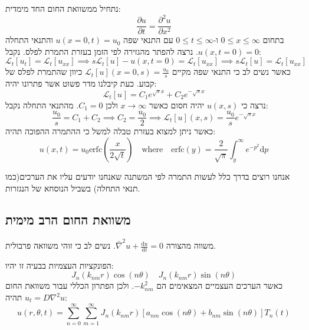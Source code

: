 \documentclass{tstextbook}
\begin{document}
\begin{example}
נתחיל ממשוואת החום החד מימדית:
$$\frac{\partial u}{\partial t} =\frac{\partial^{2}u}{\partial x^{2}} $$
בתחום \(0\leq x \leq \infty\) ו-\(0\leq t\leq \infty\) עם התנאי שפה \(u(x=0,t)=u_{0}\) והתנאי התחלה \(u(x,t=0)=0\). נרצה להפתר מהגזירה לפי הזמן בעזרת התמרת לפלס. נקבל:
$$\mathcal{L}_{t}[u_{t}]=\mathcal{L}_{t}[u_{x x}]\implies s\mathcal{L}_{t}[u]-u(x,t=0)=\mathcal{L}_{t}[u_{x x}]\implies s \mathcal{L}_{t}[u] = \mathcal{L}_{t}[u_{x x}]$$
כאשר נשים לב כי התנאי שפה מקיים \(\mathcal{L}_{t}[u](x=0,s)=\frac{u_{0}}{s}\) כיוון שהתמרת לפלס של קבוע. כעת קיבלנו מדר פשוט אשר פתרונו יהיה:
$$\mathcal{L}_{t}[u_{}]= C_{1}e^{ \sqrt{ s }x }+C_{2}e^{ -\sqrt{ s }x }$$
נרצה כי \(u(x,s)\) יהיה חסום כאשר \(x\to \infty\) ולכן \(C_{1} = 0\). מהתנאי התחלה נקבל:
$$\frac{u_{0}}{s}=C_{1}+C_{2}\implies C_{2}=\frac{u_{0}}{2}\implies \mathcal{L}_{t}[u](x,s)=\frac{u_{0}}{s}e^{ -\sqrt{ s }x }$$
כאשר ניתן למצוא בעזרת טבלה למשל כי ההתמרה ההפוכה תהיה:
$$u(x,t)=u_{0}\mathrm{erfc}\left( \frac{x}{2\sqrt{ t }} \right)\quad \mathrm{where}\quad \mathrm{erfc}(y)=\frac{2}{\sqrt{ \pi }}\int_{y}^{\infty}e^{ -p^{2} }\mathrm{d}p$$

\end{example}
\begin{remark}
אנחנו רוצים בדרך כלל לעשות התמרה לפי המשתנה שאנחנו יודעים עליו את הערכים(כמו תנאי התחלה) בשביל הנוסחא של הנגזרות.

\end{remark}
\subsection{משוואת החום הרב מימית}

\begin{definition}
משווה מהצורה \(\bar{\nabla}^2u+\frac{\mathrm{d} u}{\mathrm{d} t}=0\). נשים לב כי זוהי משוואה פרבולית.

\end{definition}
\begin{proposition}
הפונקציות העצמיות בבעיה זו יהיו:
$$J_{n}\left(k_{nm}r\right)\cos\left(n\theta\right)\quad J_{n}\left(k_{nm}r\right)\sin\left(n\theta\right)$$
כאשר הערכים העצמיים המצאימים הם \(-k_{nm}^2\).
ולכן הפתרון הכללי עבור משוואת החום \(u_t=D\nabla^2 u\) תהיה:
$$u(r,\theta,t)=\sum_{n=0}^{\infty}\sum_{m=1}^{\infty}J_{n}(k_{nm}r)[a_{nm}\cos(n\theta)+b_{nm}\sin(n\theta)]T_{n}(t)$$

\end{proposition}
\end{document}
